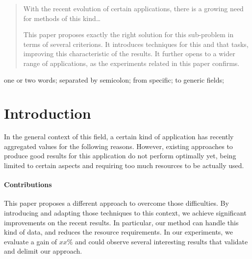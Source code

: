 \begin{abstract}
With the recent evolution of certain applications, there is a growing need for methods of this kind\ldots{}

This paper proposes exactly the right solution for this sub-problem in terms of several criterions. It introduces techniques for this and that tasks, improving this characteristic of the results. It further opens to a wider range of applications, as the experiments related in this paper confirms.

%
\end{abstract}

\begin{IEEEkeywords}
one or two words; separated by semicolon; from specific; to generic fields;

\end{IEEEkeywords}


\IEEEpeerreviewmaketitle





\section{Introduction}
%
In the general context of this field, a certain kind of application has recently aggregated values for the following reasons.
%
However, existing approaches to produce good results for this application do not perform optimally yet, being limited to certain aspects and requiring too much resources to be actually used.


\paragraph*{Contributions}
%
This paper proposes a different approach to overcome those difficulties. By introducing and adapting those techniques to this context, we achieve significant improvements on the recent results. In particular, our method can handle this kind of data, and reduces the resource requirements. In our experiments, we evaluate a gain of $xx\%$ and could observe several interesting results that validate and delimit our approach.


